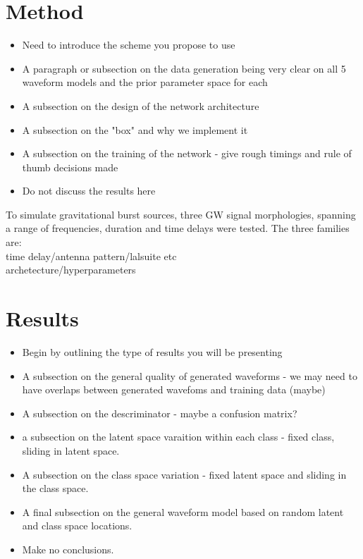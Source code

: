 \documentclass[%
 reprint,
 amsmath,amssymb,
 aps,
]{revtex4-2}
\begin{document}
\section{Method}

\begin{itemize}
\item Need to introduce the scheme you propose to use
\item A paragraph or subsection on the data generation being very clear on all
5 waveform models and the prior parameter space for each
\item A subsection on the design of the network architecture
\item A subsection on the "box" and why we implement it
\item A subsection on the training of the network - give rough timings and rule
of thumb decisions made
\item Do not discuss the results here 
\end{itemize}

To simulate gravitational burst sources, three GW signal morphologies, spanning a range of frequencies, duration and time delays were tested. The three families are:\\

time delay/antenna pattern/lalsuite etc \\

archetecture/hyperparameters

\section{Results}

\begin{itemize}
\item Begin by outlining the type of results you will be presenting
\item A subsection on the general quality of generated waveforms - we may need
to have overlaps between generated wavefoms and training data (maybe)
\item A subsection on the descriminator - maybe a confusion matrix?
\item a subsection on the latent space varaition within each class - fixed
class, sliding in latent space.
\item A subsection on the class space variation - fixed latent space and
sliding in the class space.
\item A final subsection on the general waveform model based on random latent
and class space locations.
\item Make no conclusions.
\end{itemize}
\end{document}
